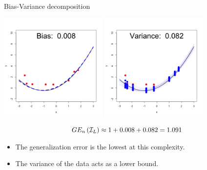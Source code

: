 \documentclass[11pt,compress,t,notes=noshow, xcolor=table]{beamer}
\begin{document}
\begin{vbframe} {Bias-Variance decomposition}
\framebreak

\begin{center}
  \includegraphics[width = 0.4\textwidth]{figure/bias_variance_decomposition-correct_model_bias.png}
  \includegraphics[width = 0.4\textwidth]{figure/bias_variance_decomposition-correct_model_variance.png}
\end{center}

$$GE_n\left(\mathcal{I}_{L}\right) \approx 1 + 0.008 + 0.082 = 1.091 $$

\begin{itemize}
  \item The generalization error is the lowest at this complexity.
  \item The variance of the data acts as a lower bound.
\end{itemize}
 

\end{vbframe}
\end{document}
